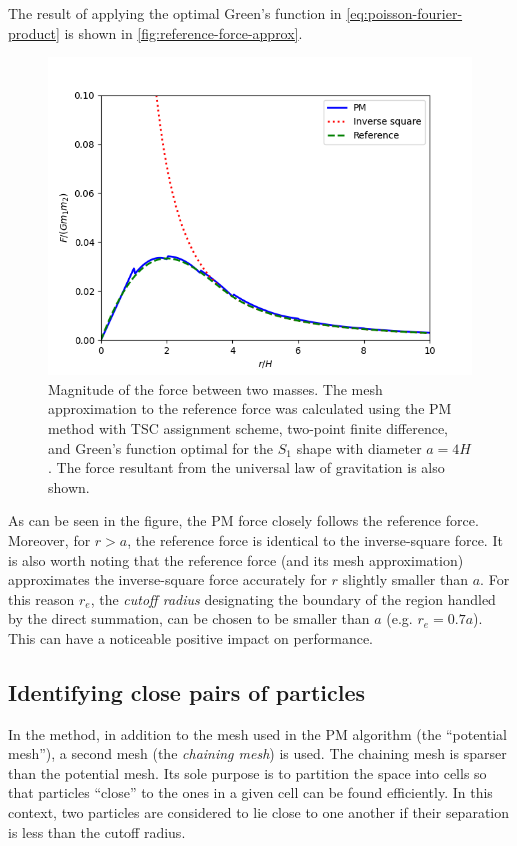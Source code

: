 The result of applying the optimal Green's function in \autoref{eq:poisson-fourier-product} is shown in \autoref{fig:reference-force-approx}.
\begin{figure}[htp]
    \centering
    \includegraphics[scale=0.6]{img/optimal-green-force-4.png}
    \caption{Magnitude of the force between two masses.
        The mesh approximation to the reference force was calculated using the PM method with TSC assignment scheme, two-point finite difference, and Green's function optimal for the $S_1$ shape with diameter $a=4H$.
        The force resultant from the universal law of gravitation is also shown.}
    \label{fig:reference-force-approx}
\end{figure}
As can be seen in the figure, the PM force closely follows the reference force.
Moreover, for $r>a$, the reference force is identical to the inverse-square force.
It is also worth noting that the reference force (and its mesh approximation) approximates the inverse-square force accurately for $r$ slightly smaller than $a$.
For this reason $r_e$, the \textit{cutoff radius} designating the boundary of the region handled by the direct summation, can be chosen to be smaller than $a$ (e.g. $r_e = 0.7a$).
This can have a noticeable positive impact on performance.

\subsection{Identifying close pairs of particles}
In the \PThreeM{} method, in addition to the mesh used in the PM algorithm (the ``potential mesh''), a second mesh (the \textit{chaining mesh}) is used.
The chaining mesh is sparser than the potential mesh.
Its sole purpose is to partition the space into cells so that particles ``close'' to the ones in a given cell can be found efficiently.
In this context, two particles are considered to lie close to one another if their separation is less than the cutoff radius.

